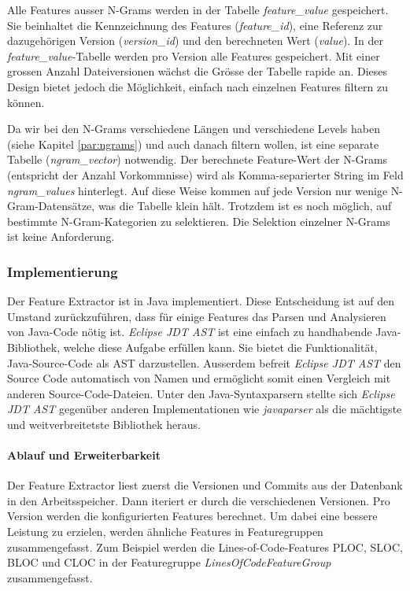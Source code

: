 \documentclass[10pt, a4paper]{article}
\begin{document}
Alle Features ausser N-Grams werden in der Tabelle \emph{feature\_value} gespeichert. Sie beinhaltet die Kennzeichnung des Features (\emph{feature\_id}), eine Referenz zur dazugehörigen Version (\emph{version\_id}) und den berechneten Wert (\emph{value}).
In der \emph{feature\_value}-Tabelle werden pro Version alle Features gespeichert. Mit einer grossen Anzahl Dateiversionen wächst die Grösse der Tabelle rapide an. Dieses Design bietet jedoch die Möglichkeit, einfach nach einzelnen Features filtern zu können.

Da wir bei den N-Grams verschiedene Längen und verschiedene Levels haben (siehe Kapitel \ref{par:ngrams}) und auch danach filtern wollen, ist eine separate Tabelle (\emph{ngram\_vector}) notwendig. Der berechnete Feature-Wert der N-Grams (entspricht der Anzahl Vorkommnisse) wird als Komma-separierter String im Feld \emph{ngram\_values} hinterlegt. Auf diese Weise kommen auf jede Version nur wenige N-Gram-Datensätze, was die Tabelle klein hält. Trotzdem ist es noch möglich, auf bestimmte N-Gram-Kategorien zu selektieren. Die Selektion einzelner N-Grams ist keine Anforderung.

\subsubsection{Implementierung}
Der Feature Extractor ist in Java implementiert. Diese Entscheidung ist auf den Umstand zurückzuführen, dass für einige Features das Parsen und Analysieren von Java-Code nötig ist. \emph{Eclipse JDT AST} \cite{eclipsejdtast} ist eine einfach zu handhabende Java-Bibliothek, welche diese Aufgabe erfüllen kann. Sie bietet die Funktionalität, Java-Source-Code als \acf{AST} darzustellen. Ausserdem befreit \emph{Eclipse JDT AST} den Source Code automatisch von Namen und ermöglicht somit einen Vergleich mit anderen Source-Code-Dateien. Unter den Java-Syntaxparsern stellte sich \emph{Eclipse JDT AST} gegenüber anderen Implementationen wie \emph{javaparser} \cite{javaparser} als die mächtigste und weitverbreitetste Bibliothek heraus.

\paragraph{Ablauf und Erweiterbarkeit}
Der Feature Extractor liest zuerst die Versionen und Commits aus der Datenbank in den Arbeitsspeicher. Dann iteriert er durch die verschiedenen Versionen. Pro Version werden die konfigurierten Features berechnet. Um dabei eine bessere Leistung zu erzielen, werden ähnliche Features in Featuregruppen zusammengefasst. Zum Beispiel werden die Lines-of-Code-Features PLOC, SLOC, BLOC und CLOC in der Featuregruppe \emph{LinesOfCodeFeatureGroup} zusammengefasst. 
\end{document}
